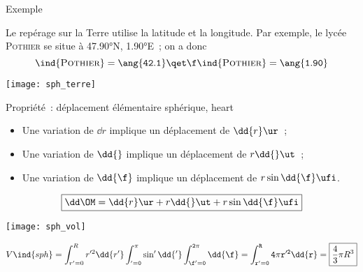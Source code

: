 \documentclass[../main/main.tex]{subfiles}
\begin{document}
\begin{rexem}{Exemple}
    \begin{minipage}{0.70\linewidth}
        Le repérage sur la Terre utilise la latitude et la longitude. Par
        exemple, le lycée \textsc{Pothier} se situe à \ang{47.90}N,
        \ang{1.90;;}E~; on a donc
        \[
            \tt\ind{\textsc{Pothier}} = \ang{42.1}
            \qet
            \f\ind{\textsc{Pothier}} = \ang{1.90}
        \]
    \end{minipage}
    \hfill
    \begin{minipage}{0.25\linewidth}
        \begin{center}
            \texttt{[image: sph\_terre]}
        \end{center}
    \end{minipage}
\end{rexem}


\begin{tprop}{Propriété~: déplacement élémentaire sphérique, heart}
    \begin{minipage}{0.70\linewidth}
        \begin{itemize}
            \item Une variation de $\dd{r}$ implique un déplacement de $\dd{r}\ur$~;
            \item Une variation de $\dd{\tt}$ implique un déplacement de
                $r\dd{\tt}\ut$~;
            \item Une variation de $\dd{\f}$ implique un déplacement de
                $r\sin\tt\dd{\f}\ufi$.
        \end{itemize} \bigbreak
    \[\boxed{\dd\OM = \dd{r}\ur + r\dd{\tt}\ut + r\sin\tt\dd{\f}\ufi}\]
    \end{minipage}
    \hfill
    \begin{minipage}{0.29\linewidth}
        \begin{center}
            \texttt{[image: sph\_vol]}
        \end{center}
    \end{minipage}
\end{tprop}

\[V\ind{sph}
    = \int_{r'=0}^{R} r'^2\dd{r'}
        \int_{\tt' = 0}^{\pi} \sin\tt'\dd{\tt'}
        \int_{\f'=0}^{2\pi} \dd{\f}
    = \int_{r'=0}^{R} 4\pi r'^2 \dd{r}
    = \boxed{\frac{4}{3}\pi R^3}
\]
\end{document}
